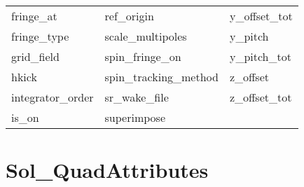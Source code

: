 \begin{tabular}{lll}
fringe_at                   & ref_origin                  & y_offset_tot                \\
fringe_type                 & scale_multipoles            & y_pitch                     \\
grid_field                  & spin_fringe_on              & y_pitch_tot                 \\
hkick                       & spin_tracking_method        & z_offset                    \\
integrator_order            & sr_wake_file                & z_offset_tot                \\
is_on                       & superimpose                 &                             \\
 \bottomrule
 \end{tabular}
 \vfill
 
 \section{Sol_QuadAttributes}
 \label{s:list.sol.quad}
 
